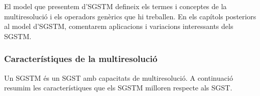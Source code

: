 El model que presentem d'\gls{SGSTM} defineix els termes i conceptes
de la multiresolució i els operadors genèrics que hi treballen. En els
capítols posteriors al model d'\gls{SGSTM}, comentarem aplicacions i variacions interessants dels \gls{SGSTM}.






\subsubsection{Característiques de la multiresolució}






Un \gls{SGSTM} és un \gls{SGST} amb capacitats de multiresolució.  A
continuació resumim les característiques que els \gls{SGSTM} milloren
respecte als \gls{SGST}.

